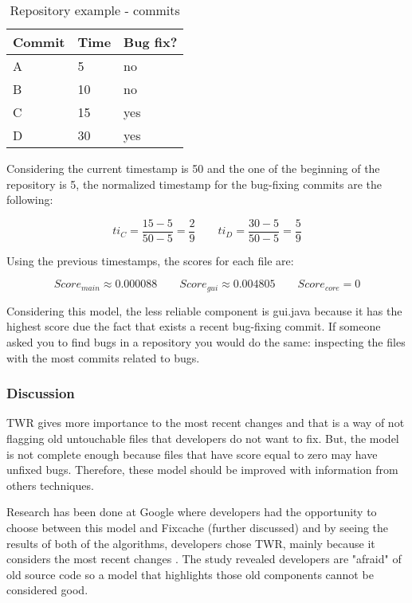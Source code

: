 \begin{table}[H]
    \begin{center}
        \caption{Repository example - commits}
        \label{table:repo_commits}
        \begin{tabular}{ | l | l | l | }
            \hline
            Commit & Time & Bug fix? \\ \hline
            A & 5 & no \\ \hline
            B & 10 & no\\ \hline
            C & 15 & yes  \\ \hline
            D & 30 & yes  \\ \hline
        \end{tabular}
    \end{center}
\end{table}
Considering the current timestamp is 50 and the one of the beginning of the repository is 5, the normalized timestamp for the bug-fixing commits are the following:

\begin{equation}
ti_C = \frac{15 - 5}{50 - 5} = \frac{2}{9}\qquad
ti_D = \frac{30 - 5}{50 - 5} = \frac{5}{9}
\end{equation}

Using the previous timestamps, the scores for each file are: 

\begin{equation}
Score_{main} \approx 0.000088 \qquad
Score_{gui} \approx 0.004805 \qquad
Score_{core} = 0
\end{equation}

Considering this model, the less reliable component is gui.java because it has the highest score due the fact that exists a recent bug-fixing commit. If someone asked you to find bugs in a repository you would do the same: inspecting the files with the most commits related to bugs. 

\subsubsection{Discussion}

TWR gives more importance to the most recent changes and that is a way of not flagging old untouchable files that developers do not want to fix. But, the model is not complete enough because files that have score equal to zero may have unfixed bugs. Therefore, these model should be improved with information from others techniques.

Research has been done at Google where developers had the opportunity to choose between this model and Fixcache (further discussed) and by seeing the results of both of the algorithms, developers chose TWR, mainly because it considers the most recent changes \cite{Chris2013}. The study revealed developers are "afraid" of old source code so a model that highlights those old components cannot be considered good.

